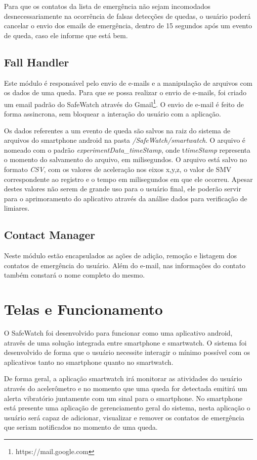 Para que os contatos da lista de emergência não sejam incomodados desnecessariamente na ocorrência de falsas detecções de quedas, o usuário poderá cancelar o envio dos emails de emergência, dentro de 15 segundos após um evento de queda, caso ele informe que está bem.

\subsection{Fall Handler} 
Este módulo é responsável pelo envio de e-mails e a manipulação de arquivos com os dados de uma queda. Para que se possa realizar o envio de e-mails, foi criado um email padrão do SafeWatch através do Gmail\footnote{https://mail.google.com}. O envio de e-mail é feito de forma assincrona, sem bloquear a interação do usuário com a aplicação. 

Os dados referentes a um evento de queda são salvos na raiz do sistema de arquivos do smartphone android na pasta \textit{/SafeWatch/smartwatch}. O arquivo é nomeado com o padrão \textit{experimentData\_timeStamp}, onde t\textit{timeStamp} representa o momento do salvamento do arquivo, em milisegundos. O arquivo está salvo no formato \textit{CSV}, com os valores de aceleração nos eixos x,y,z, o valor de \ac{SMV} correspondente ao registro e o tempo em milisegundos em que ele ocorreu. Apesar destes valores não serem de grande uso para o usuário final, ele poderão servir para o aprimoramento do aplicativo através da análise dados para verificação de limiares. 

\subsection{Contact Manager}
Neste módulo estão encapsulados as ações de adição, remoção e listagem dos contatos de emergência do usuário. Além do e-mail, nas informações do contato também constará o nome completo do mesmo. 


\section{Telas e Funcionamento}
\label{sec:screens}
O SafeWatch foi desenvolvido para funcionar como uma aplicativo android, atravês de uma solução integrada entre smartphone e smartwatch. O sistema foi desenvolvido de forma que o usuário necessite interagir o mínimo possível com os aplicativos tanto no smartphone quanto no smartwatch. 

De forma geral, a aplicação smartwatch irá monitorar as atividades do usuário através do acelerômetro e no momento que uma queda for detectada emitirá um alerta vibratório juntamente com um sinal para o smartphone. No smartphone está presente uma aplicação de gerenciamento geral do sistema, nesta aplicação o usuário será capaz de adicionar, visualizar e remover os contatos de emergência que seriam notificados no momento de uma queda.

